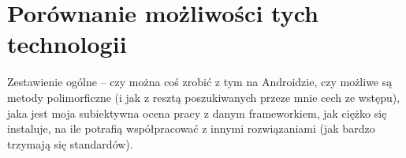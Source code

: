 
\section{Porównanie możliwości tych technologii}
Zestawienie ogólne -- czy można coś zrobić z tym na Androidzie, czy możliwe są metody polimorficzne (i jak z resztą poszukiwanych przeze mnie cech ze wstępu), jaka jest moja subiektywna ocena pracy z danym frameworkiem, jak ciężko się instaluje, na ile potrafią współpracować z innymi rozwiązaniami (jak bardzo trzymają się standardów).

